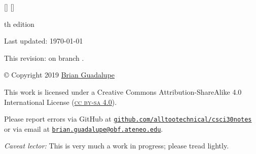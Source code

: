 \thispagestyle{empty}
[\head]
\StrBehind[2]{\head}{/}[\branch]


\vspace*{\fill}
\begin{center}
\begin{minipage}{0.5\textwidth}
\begin{center}
\small
\textonehalf th edition

Last updated: \today

\vspace{0.5cm}
This revision: \href{https://github.com/alltootechnical/csci30notes/commit/\commit}{\texttt{\commit}} on branch \href{https://github.com/alltootechnical/csci30notes/tree/\branch}{\texttt{\branch}}.
\vspace{1cm}

\copyright{} Copyright 2019 \href{http://penoy.admu.edu.ph/~guadalupe154884/}{Brian Guadalupe}

\vspace{0.5cm}
\ccbysa

This work is licensed under a Creative Commons Attribution-ShareAlike 4.0 International License (\href{http://creativecommons.org/licenses/by-sa/4.0/}{\textsc{cc by-sa 4.0}}).

\vspace{1cm}
Please report errors via GitHub at \href{https://github.com/alltootechnical/csci30notes/issues}{\texttt{github.com/alltootechnical/csci30notes}} or via email at \href{mailto:brian.guadalupe+csci30notes@obf.ateneo.edu}{\texttt{brian.guadalupe@obf.ateneo.edu}}.

\vspace{0.5cm}
\textit{Caveat lector:} This is very much a work in progress; please tread lightly.

\end{center}
\end{minipage}
\end{center}
